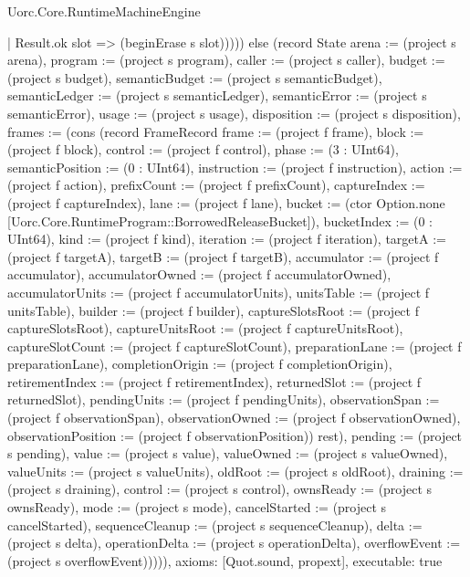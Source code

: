 \begin{lexlean}{Uorc.Core.RuntimeMachineEngine}
\begin{semanticmodule}
{          | Result.ok slot => (beginErase s slot))))) else (record State {arena := (project s arena), program := (project s program), caller := (project s caller), budget := (project s budget), semanticBudget := (project s semanticBudget), semanticLedger := (project s semanticLedger), semanticError := (project s semanticError), usage := (project s usage), disposition := (project s disposition), frames := (cons (record FrameRecord {frame := (project f frame), block := (project f block), control := (project f control), phase := (3 : UInt64), semanticPosition := (0 : UInt64), instruction := (project f instruction), action := (project f action), prefixCount := (project f prefixCount), captureIndex := (project f captureIndex), lane := (project f lane), bucket := (ctor Option.none [Uorc.Core.RuntimeProgram::BorrowedReleaseBucket]), bucketIndex := (0 : UInt64), kind := (project f kind), iteration := (project f iteration), targetA := (project f targetA), targetB := (project f targetB), accumulator := (project f accumulator), accumulatorOwned := (project f accumulatorOwned), accumulatorUnits := (project f accumulatorUnits), unitsTable := (project f unitsTable), builder := (project f builder), captureSlotsRoot := (project f captureSlotsRoot), captureUnitsRoot := (project f captureUnitsRoot), captureSlotCount := (project f captureSlotCount), preparationLane := (project f preparationLane), completionOrigin := (project f completionOrigin), retirementIndex := (project f retirementIndex), returnedSlot := (project f returnedSlot), pendingUnits := (project f pendingUnits), observationSpan := (project f observationSpan), observationOwned := (project f observationOwned), observationPosition := (project f observationPosition)}) rest), pending := (project s pending), value := (project s value), valueOwned := (project s valueOwned), valueUnits := (project s valueUnits), oldRoot := (project s oldRoot), draining := (project s draining), control := (project s control), ownsReady := (project s ownsReady), mode := (project s mode), cancelStarted := (project s cancelStarted), sequenceCleanup := (project s sequenceCleanup), delta := (project s delta), operationDelta := (project s operationDelta), overflowEvent := (project s overflowEvent)})))),
  axioms: [Quot.sound, propext],
  executable: true
}


\end{semanticmodule}
\end{lexlean}
